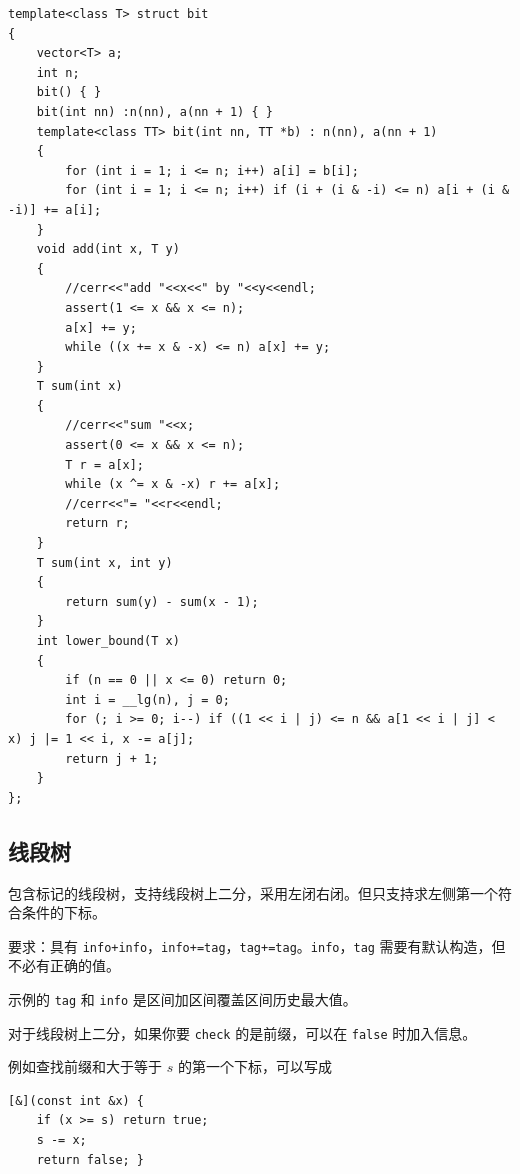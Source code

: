 \documentclass[12pt]{ctexart}
\begin{document}
\begin{lstlisting}
template<class T> struct bit
{
	vector<T> a;
	int n;
	bit() { }
	bit(int nn) :n(nn), a(nn + 1) { }
	template<class TT> bit(int nn, TT *b) : n(nn), a(nn + 1)
	{
		for (int i = 1; i <= n; i++) a[i] = b[i];
		for (int i = 1; i <= n; i++) if (i + (i & -i) <= n) a[i + (i & -i)] += a[i];
	}
	void add(int x, T y)
	{
		//cerr<<"add "<<x<<" by "<<y<<endl;
		assert(1 <= x && x <= n);
		a[x] += y;
		while ((x += x & -x) <= n) a[x] += y;
	}
	T sum(int x)
	{
		//cerr<<"sum "<<x;
		assert(0 <= x && x <= n);
		T r = a[x];
		while (x ^= x & -x) r += a[x];
		//cerr<<"= "<<r<<endl;
		return r;
	}
	T sum(int x, int y)
	{
		return sum(y) - sum(x - 1);
	}
	int lower_bound(T x)
	{
		if (n == 0 || x <= 0) return 0;
		int i = __lg(n), j = 0;
		for (; i >= 0; i--) if ((1 << i | j) <= n && a[1 << i | j] < x) j |= 1 << i, x -= a[j];
		return j + 1;
	}
};
\end{lstlisting}

\subsection{线段树}

包含标记的线段树，支持线段树上二分，采用左闭右闭。但只支持求左侧第一个符合条件的下标。

要求：具有 \verb|info+info|，\verb|info+=tag|，\verb|tag+=tag|。\verb|info|，\verb|tag| 需要有默认构造，但不必有正确的值。

示例的 \verb|tag| 和 \verb|info| 是区间加区间覆盖区间历史最大值。

对于线段树上二分，如果你要 \verb|check| 的是前缀，可以在 \verb|false| 时加入信息。

例如查找前缀和大于等于 $s$ 的第一个下标，可以写成

\begin{lstlisting}
[&](const int &x) {
	if (x >= s) return true;
	s -= x;
	return false; }
\end{lstlisting}
\end{document}
